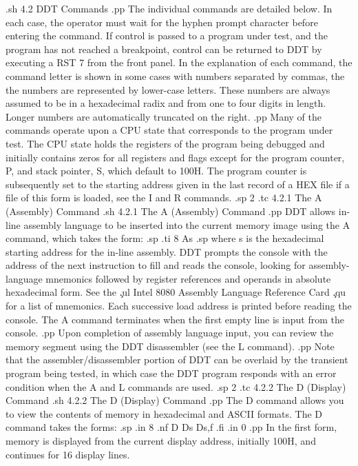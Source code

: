 .sh
4.2  DDT Commands
.pp
The individual commands are detailed below.  In each case, the 
operator must wait for the hyphen prompt character before entering 
the command.  If control is passed to a program under test, and 
the program has not reached a breakpoint, control can be returned 
to DDT by executing a RST 7 from the front panel.  In the 
explanation of each command, the command letter is shown in some 
cases with numbers separated by commas, the the numbers are 
represented by lower-case letters.  These numbers are always 
assumed to be in a hexadecimal radix and from one to four digits 
in length.  Longer numbers are automatically truncated on the 
right.
.pp
Many of the commands operate upon a CPU state that corresponds 
to the program under test.  The CPU state holds the registers of 
the program being debugged and initially contains zeros for all 
registers and flags except for the program counter, P, and stack 
pointer, S, which default to 100H.  The program counter is 
subsequently set to the starting address given in the last record 
of a HEX file if a file of this form is loaded, see the I and R 
commands.
.sp 2
.tc         4.2.1  The A (Assembly) Command
.sh
4.2.1  The A (Assembly) Command
.pp
DDT allows in-line assembly language to be inserted into the 
current memory image using the A command, which takes the form:
.sp
.ti 8
As
.sp
where s is the hexadecimal starting address for the in-line 
assembly.  DDT prompts the console with the address of the next 
instruction to fill and reads the console, looking for assembly-language
mnemonics followed by register references and operands in
absolute hexadecimal form.  See the \c
.ul
Intel 8080 Assembly Language Reference Card \c
.qu
for a list of mnemonics.  Each 
successive load address is printed before reading the console.  
The A command terminates when the first empty line is input from 
the console.
.pp
Upon completion of assembly language input, you can 
review the memory segment using the DDT disassembler (see the L 
command).
.pp
Note that the assembler/disassembler portion of 
DDT can be overlaid by the transient program being tested, in 
which case the DDT program responds with an error condition when 
the A and L commands are used.
.sp 2
.tc         4.2.2  The D (Display) Command
.sh
4.2.2  The D (Display) Command
.pp
The D command allows you to view the contents of memory 
in hexadecimal and ASCII formats.  The D command takes the forms:
.sp
.in 8
.nf
D
Ds
Ds,f
.fi
.in 0
.pp
In the first form, memory is displayed from the current display 
address, initially 100H, and continues for 16 display lines.  
